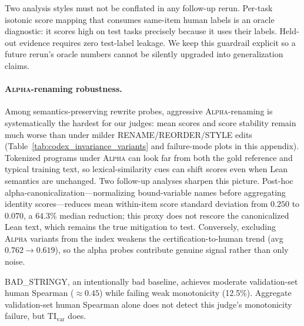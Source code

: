 \documentclass{article}
\begin{document}
Two analysis styles must not be conflated in any follow-up rerun.
Per-task isotonic score mapping that consumes same-item human labels is an oracle diagnostic: it scores high on test tasks precisely because it uses their labels.
Held-out evidence requires zero test-label leakage.
We keep this guardrail explicit so a future rerun's oracle numbers cannot be silently upgraded into generalization claims.

\paragraph{\textsc{Alpha}-renaming robustness.}
Among semantics-preserving rewrite probes, aggressive \textsc{Alpha}-renaming is systematically the hardest for our judges: mean scores and score stability remain much worse than under milder RENAME/REORDER/STYLE edits (Table~\ref{tab:codex_invariance_variants} and failure-mode plots in this appendix).
Tokenized programs under \textsc{Alpha} can look far from both the gold reference and typical training text, so lexical-similarity cues can shift scores even when Lean semantics are unchanged.
Two follow-up analyses sharpen this picture.
Post-hoc alpha-canonicalization---normalizing bound-variable names before aggregating identity scores---reduces mean within-item score standard deviation from \(0.250\) to \(0.070\), a \(64.3\%\) median reduction; this proxy does not rescore the canonicalized Lean text, which remains the true mitigation to test.
Conversely, excluding \textsc{Alpha} variants from the index weakens the certification-to-human trend (avg \(0.762 \rightarrow 0.619\)), so the alpha probes contribute genuine signal rather than only noise.

BAD\_STRINGY, an intentionally bad baseline, achieves moderate validation-set human Spearman (\(\approx0.45\)) while failing weak monotonicity (12.5\%).
Aggregate validation-set human Spearman alone does not detect this judge's monotonicity failure, but \(\mathrm{TI}_{\mathrm{var}}\) does.
\end{document}
